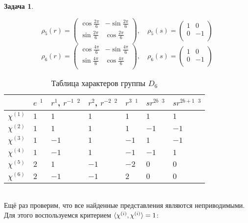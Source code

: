 \documentclass[12pt]{article}
\theoremstyle{definition}
\newtheorem{zad}{Задача}[section]
\begin{document}
\begin{zad}
\begin{itemize}
\begin{equation}
    \boxed{\rho_5(r)=\left(
    \begin{array}{cc}
    \cos\frac{2\pi}{6} & -\sin\frac{2\pi}{6}\\
    \sin\frac{2\pi}{6} & \cos\frac{2\pi}{6}\\
    \end{array}
    \right),\quad \rho_5(s)=\left(
    \begin{array}{cc}
    1 & 0\\
    0 & -1\\
    \end{array}
    \right)}
\end{equation}
\begin{equation}
    \boxed{\rho_6(r)=\left(
    \begin{array}{cc}
    \cos\frac{4\pi}{6} & -\sin\frac{4\pi}{6}\\
    \sin\frac{4\pi}{6} & \cos\frac{4\pi}{6}\\
    \end{array}
    \right),\quad \rho_6(s)=\left(
    \begin{array}{cc}
    1 & 0\\
    0 & -1\\
    \end{array}
    \right)}
\end{equation}
\begin{table}[h!]
\centering
\begin{tabular}{|l|l|l|l|l|l|l|}
\hline
 & $e$ $^1$ & $r^1$, $r^{-1}$ $^2$ & $r^2$, $r^{-2}$ $^2$ & $r^3$ $^1$ & $sr^{2b}$ $^3$ & $sr^{2b+1}$ $^3$ \\ \hline
$\chi^{(1)}$ & $1$ & $1$ & $1$ & $1$ & $1$ & $1$ \\ \hline
$\chi^{(2)}$ & $1$ & $1$ & $1$ & $1$ & $-1$ & $-1$\\ \hline
$\chi^{(3)}$ & $1$ & $-1$ & $1$ & $-1$ & $1$ & $-1$\\ \hline
$\chi^{(4)}$ & $1$ & $-1$ & $1$ & $-1$ & $-1$ & $1$\\ \hline
$\chi^{(5)}$ & $2$ & $1$ & $-1$ & $-2$ & $0$ & $0$ \\ \hline
$\chi^{(6)}$ & $2$ & $-1$ & $-1$ & $2$ & $0$ & $0$ \\ \hline
\end{tabular}
\caption{Таблица характеров группы $D_6$}
\end{table}\\
Ещё раз проверим, что все найденные представления являются неприводимыми. Для этого воспользуемся критерием $\braket{\chi^{(i)},\chi^{(i)}}=1$:

\end{itemize}
\end{zad}
\end{document}
